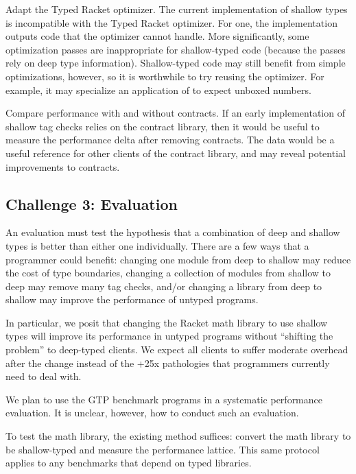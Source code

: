 Adapt the Typed Racket optimizer.
The current implementation of shallow types is incompatible with the Typed
Racket optimizer.
For one, the implementation outputs code that the optimizer cannot handle.
More significantly, some optimization passes are inappropriate for shallow-typed
code (because the passes rely on deep type information).
Shallow-typed code may still benefit from simple optimizations, however,
so it is worthwhile to try reusing the optimizer.
For example, it may specialize an application of \racketcode{+} to expect unboxed numbers.

Compare performance with and without contracts.
If an early implementation of shallow tag checks relies on the contract library,
then it would be useful to measure the performance delta after removing contracts.
The data would be a useful reference for other clients of the contract library,
and may reveal potential improvements to contracts.


\subsection{Challenge 3: Evaluation}


An evaluation must test the hypothesis that a combination of deep and shallow
 types is better than either one individually.
There are a few ways that a programmer could benefit:
 changing one module from deep to shallow may reduce the cost of type boundaries,
 changing a collection of modules from shallow to deep may remove many tag checks,
 and/or changing a library from deep to shallow may improve the performance of untyped programs.

In particular, we posit that changing the Racket math library to use shallow
types will improve its performance in untyped programs without ``shifting the problem''
to deep-typed clients.
We expect all clients to suffer moderate overhead after the change instead
of the +25x pathologies that programmers currently need to deal with.

We plan to use the GTP benchmark programs in a systematic performance evaluation.
It is unclear, however, how to conduct such an evaluation.

To test the math library, the existing method suffices:
 convert the math library to be shallow-typed and measure the performance lattice.
This same protocol applies to any benchmarks that depend on typed libraries.

